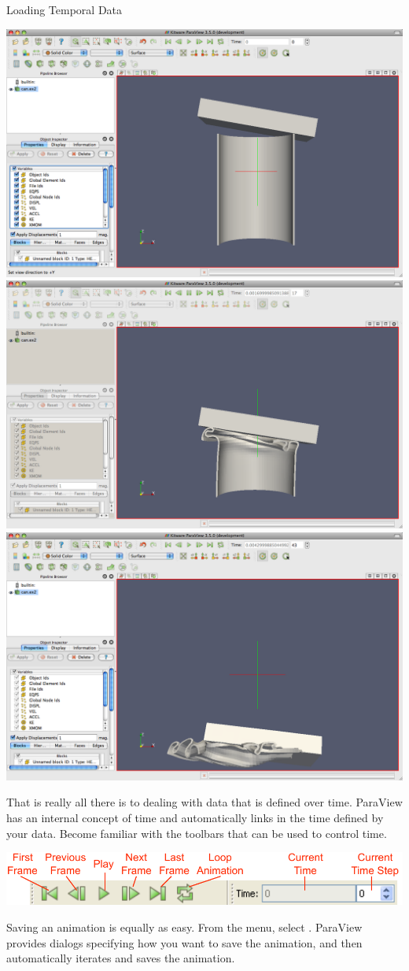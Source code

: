 \begin{exercise}{Loading Temporal Data}
  \begin{inlinefig}
    \includegraphics[width=.32\linewidth]{images/AnimateCan1}
    \includegraphics[width=.32\linewidth]{images/AnimateCan2}
    \includegraphics[width=.32\linewidth]{images/AnimateCan3}
  \end{inlinefig}
\end{exercise}

That is really all there is to dealing with data that is defined over time.
ParaView has an internal concept of time and automatically links in the
time defined by your data.  Become familiar with the toolbars that can be
used to control time.

\begin{inlinefig}
  \includegraphics[width=\linewidth]{images/AnimationToolbar}
\end{inlinefig}

Saving an animation is equally as easy.  From the menu, select 
\ra {}.  ParaView provides dialogs specifying how you
want to save the animation, and then automatically iterates and saves the
animation.

